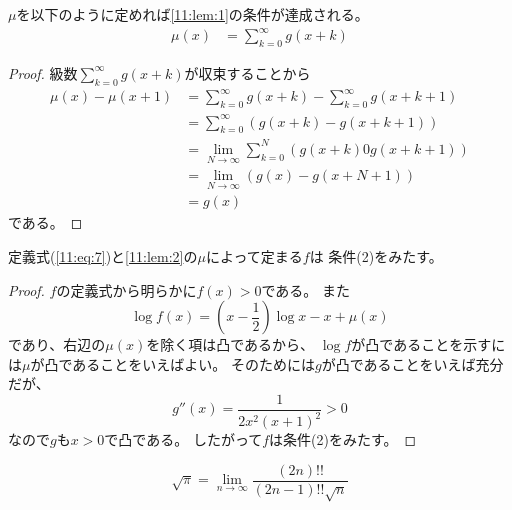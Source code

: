 \documentclass[report]{jlreq}
\begin{document}
\begin{lemma}
    $\mu$を以下のように定めれば\cref{11:lem:1}の条件が達成される。
    \begin{equation}
        \begin{split}
            \mu(x) &= \sum_{k=0}^\infty g(x + k)
        \end{split}
    \end{equation}
    \label{11:lem:2}
\end{lemma}

\begin{proof}
    級数$\sum_{k=0}^\infty g(x + k)$が収束することから
    \begin{equation}
        \begin{split}
            \mu(x) - \mu(x + 1)
                &= \sum_{k=0}^\infty g(x + k) - \sum_{k=0}^\infty g(x + k + 1) \\
                &= \sum_{k=0}^\infty (g(x + k) - g(x + k + 1)) \\
                &= \lim_{N \to \infty} \sum_{k=0}^N (g(x + k) 0 g(x + k + 1)) \\
                &= \lim_{N \to \infty} (g(x) - g(x + N + 1)) \\
                &= g(x)
        \end{split}
    \end{equation}
    である。
\end{proof}

\begin{lemma}
    定義式(\ref{11:eq:7})と\cref{11:lem:2}の$\mu$によって定まる$f$は
    条件(2)をみたす。
    \label{11:lem:3}
\end{lemma}

\begin{proof}
    $f$の定義式から明らかに$f(x) > 0$である。
    また
    \begin{equation}
        \log f(x) = \left(x - \frac{1}{2}\right) \log x - x + \mu(x)
    \end{equation}
    であり、右辺の$\mu(x)$を除く項は凸であるから、
    $\log f$が凸であることを示すには$\mu$が凸であることをいえばよい。
    そのためには$g$が凸であることをいえば充分だが、
    \begin{equation}
        g''(x) = \frac{1}{2x^2 (x+1)^2} > 0
    \end{equation}
    なので$g$も$x > 0$で凸である。
    したがって$f$は条件(2)をみたす。
\end{proof}

    \begin{lemma}
        \begin{equation}
            \sqrt{\pi} = \lim_{n \to \infty} \frac{(2n)!!}{(2n - 1)!! \sqrt{n}}
        \end{equation}
    \end{lemma}
\end{document}
